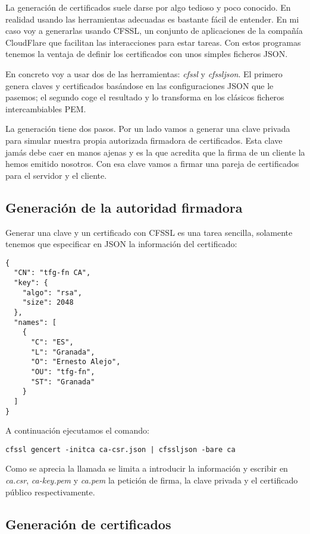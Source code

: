 La generación de certificados suele darse por algo tedioso y poco conocido. En realidad usando las herramientas adecuadas  es bastante fácil de entender. En mi caso voy a generarlas usando CFSSL\cite{cfssl}, un conjunto de aplicaciones de la compañía CloudFlare que facilitan las interacciones para estar tareas. Con estos programas tenemos la ventaja de definir los certificados con unos simples ficheros JSON.

En concreto voy a usar dos de las herramientas: \emph{cfssl} y \emph{cfssljson}. El primero genera claves y certificados basándose en las configuraciones JSON que le pasemos; el segundo coge el resultado y lo transforma en los clásicos ficheros intercambiables PEM.

La generación tiene dos pasos. Por un lado vamos a generar una clave privada para simular nuestra propia autorizada firmadora de certificados. Esta clave jamás debe caer en manos ajenas y es la que acredita que la firma de un cliente la hemos emitido nosotros. Con esa clave vamos a firmar una pareja de certificados para el servidor y el cliente.

\subsection{Generación de la autoridad firmadora}

Generar una clave y un certificado con CFSSL es una tarea sencilla, solamente tenemos que especificar en JSON la información del certificado:

\begin{verbatim}
{
  "CN": "tfg-fn CA",
  "key": {
    "algo": "rsa",
    "size": 2048
  },
  "names": [
    {
      "C": "ES",
      "L": "Granada",
      "O": "Ernesto Alejo",
      "OU": "tfg-fn",
      "ST": "Granada"
    }
  ]
}
\end{verbatim}

A continuación ejecutamos el comando:

\texttt{cfssl gencert -initca ca-csr.json | cfssljson -bare ca}

Como se aprecia la llamada se limita a introducir la información y escribir en \emph{ca.csr}, \emph{ca-key.pem} y \emph{ca.pem} la petición de firma, la clave privada y el certificado público respectivamente.

\subsection{Generación de certificados}

